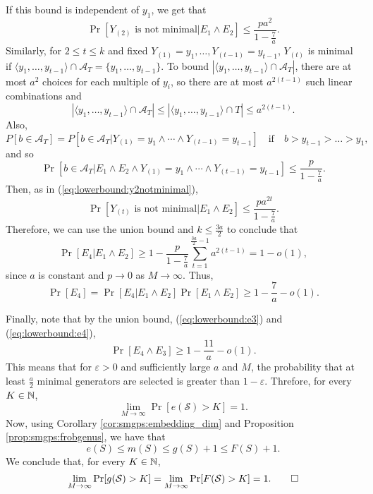 \begin{itemize}
    If this bound is independent of $y_1$, we get that 
    \begin{equation}\label{eq:lowerbound:y2notminimal}
        \Pr[Y_{(2)} \text{ is not minimal}|E_1\land E_2] \leq \frac{pa^2}{1 - \frac{7}{a}}.
    \end{equation}
    Similarly, for $2 \leq t \leq k$ and fixed $Y_{(1)} = y_1, \ldots, Y_{(t - 1)} = y_{t - 1}$, $Y_{(t)}$ is minimal if $\langle y_1, \ldots, y_{t - 1}\rangle \cap \mathcal{A}_T = \{y_1, \ldots, y_{t - 1}\}$. To bound $|\langle y_1, \ldots, y_{t - 1}\rangle \cap \mathcal{A}_T|$, there are at most $a^2$ choices for each multiple of $y_i$, so there are at most $a^{2(t - 1)}$ such linear combinations and
    \[|\langle y_1, \ldots, y_{t - 1} \rangle \cap  \mathcal{A}_T| \leq |\langle y_1, \ldots, y_{t - 1} \rangle \cap T| \leq a^{2(t - 1)}.\]
    Also, 
    \[P[b \in \mathcal{A}_T] = P[b \in \mathcal{A}_T|Y_{(1)} = y_1\land \cdots \land Y_{(t - 1)} = y_{t - 1}] \quad \text{if} \quad  b > y_{t - 1} > \ldots > y_1,\]
    and so
    \[
        \Pr[b \in \mathcal{A}_T|E_1 \land E_2 \land Y_{(1)} = y_1 \land \cdots \land Y_{(t - 1)} = y_{t - 1}] \leq \frac{p}{1 - \frac{7}{a}}.
    \]
    Then, as in (\ref{eq:lowerbound:y2notminimal}), 
    \[\Pr[Y_{(t)} \text{ is not minimal}|E_1\land E_2] \leq \frac{pa^{2t}}{1 - \frac{7}{a}} .\]
    Therefore, we can use the union bound and $k \leq \frac{3a}{2}$ to conclude that
    \[\Pr[E_4|E_1 \land E_2] \geq 1 - \frac{p}{1 - \frac{7}{a}}\sum_{t = 1}^{\frac{3a}{2} - 1}a^{2(t - 1)} = 1 - o(1),\]
    since $a$ is constant and $p \to 0$ as $M  \to \infty$.
    Thus,  
    \begin{equation}\label{eq:lowerbound:e4}
        \Pr[E_4] = \Pr[E_4| E_1 \land E_2]\Pr[E_1\land E_2] \geq 1 - \frac{7}{a} - o(1).
    \end{equation}
\end{itemize}


Finally, note that by the union bound, (\ref{eq:lowerbound:e3}) and (\ref{eq:lowerbound:e4}),
\[\Pr[E_4 \land E_3] \geq 1 - \frac{11}{a} - o(1).\] 
This means that for $\varepsilon > 0$ and sufficiently large $a$ and $M$, the probability that at least $\frac{a}{2}$ minimal generators are selected is greater than $1 - \varepsilon$. Threfore, for every $K \in \NN$, 
\[\lim_{M \to \infty} \Pr[e(\mathcal{S}) > K] = 1.\]
Now, using Corollary \ref{cor:smgps:embedding_dim} and Proposition \ref{prop:smgps:frobgenus}, we have that
\[e(S) \leq m(S) \leq g(S) + 1 \leq F(S) + 1.\]
We conclude that, for every $K \in \NN$,
\[\lim_{M \to \infty} \Pr[g(\mathcal{S}) > K] = \lim_{M \to \infty} \Pr[F(\mathcal{S}) > K] = 1.\qed\]

